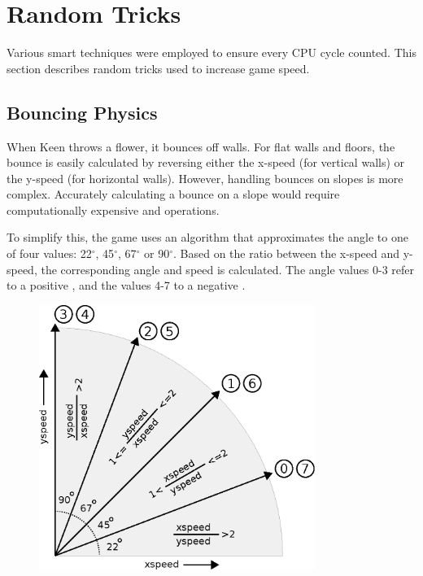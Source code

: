 \documentclass[book.tex]{subfiles}
\begin{document}
\section{Random Tricks}
Various smart techniques were employed to ensure every CPU cycle counted. This section describes random tricks used to increase game speed.


\subsection{Bouncing Physics}
When Keen throws a flower, it bounces off walls. For flat walls and floors, the bounce is easily calculated by reversing either the x-speed (for vertical walls) or the y-speed (for horizontal walls). However, handling bounces on slopes is more complex. Accurately calculating a bounce on a slope would require computationally expensive  and  operations.\\

\par
To simplify this, the game uses an algorithm that approximates the angle to one of four  values: 22$^{\circ}$, 45$^{\circ}$, 67$^{\circ}$ or 90$^{\circ}$. Based on the ratio between the x-speed and y-speed, the corresponding angle and speed is calculated. The angle values 0-3 refer to a positive , and the values 4-7 to a negative .\\

\par
\begin{figure}[H]
\centering
\includegraphics[width=0.8\textwidth]{imgs/drawings/angle_ratio.eps}
\label{fig:angles}
\end{figure}
\end{document}
